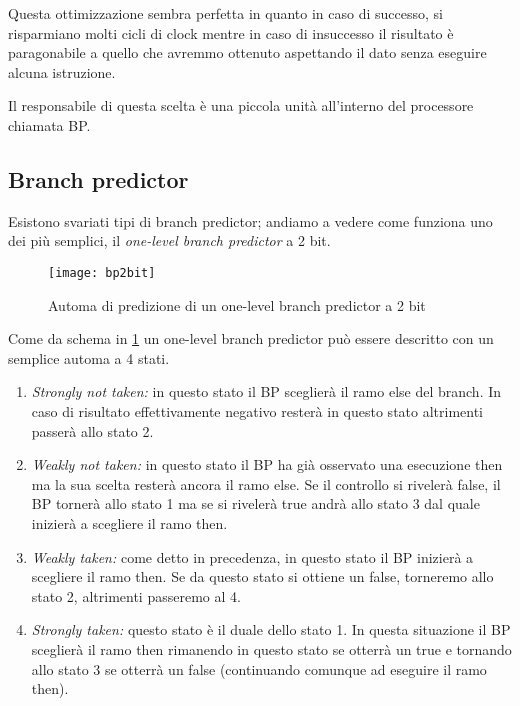 		Questa ottimizzazione sembra perfetta in quanto in caso di successo, si risparmiano molti cicli di clock mentre in caso di insuccesso il risultato è paragonabile a quello che avremmo ottenuto aspettando il dato senza eseguire alcuna istruzione.
		
		Il responsabile di questa scelta è una piccola unità all'interno del processore chiamata \ac{BP}.
		
		\subsection{Branch predictor}
			Esistono svariati tipi di branch predictor; andiamo a vedere come funziona uno dei più semplici, il \emph{one-level branch predictor} a 2 bit.
			
			\begin{figure}
				\begin{center}
					\texttt{[image: bp2bit]}
					\caption{Automa di predizione di un one-level branch predictor a 2 bit}
					\label{fig:bp2bits}
				\end{center}
			\end{figure}
		
			Come da schema in \cref{fig:bp2bits} un one-level branch predictor può essere descritto con un semplice automa a 4 stati.
			
			\begin{enumerate}
				\item \emph{Strongly not taken:} in questo stato il \ac{BP} sceglierà il ramo else del branch. In caso di risultato effettivamente negativo resterà in questo stato altrimenti passerà allo stato 2.
				\item \emph{Weakly not taken:} in questo stato il \ac{BP} ha già osservato una esecuzione then ma la sua scelta resterà ancora il ramo else. Se il controllo si rivelerà false, il \ac{BP} tornerà allo stato 1 ma se si rivelerà true andrà allo stato 3 dal quale inizierà a scegliere il ramo then.
				\item \emph{Weakly taken:} come detto in precedenza, in questo stato il \ac{BP} inizierà a scegliere il ramo then. Se da questo stato si ottiene un false, torneremo allo stato 2, altrimenti passeremo al 4.
				\item \emph{Strongly taken:} questo stato è il duale dello stato 1. In questa situazione il \ac{BP} sceglierà il ramo then rimanendo in questo stato se otterrà un true e tornando allo stato 3 se otterrà un false (continuando comunque ad eseguire il ramo then).
			\end{enumerate}
		
